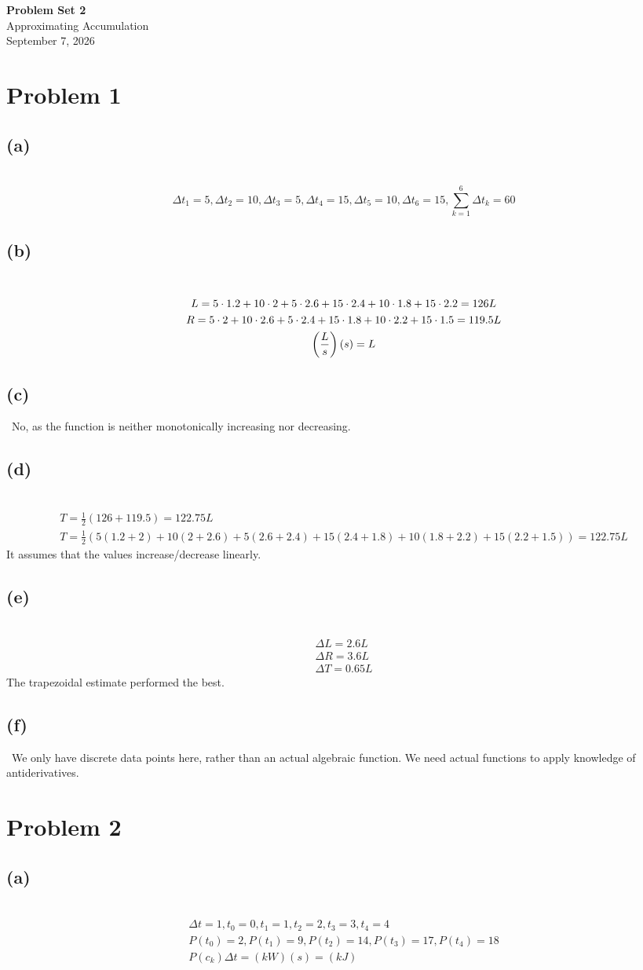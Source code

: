 \documentclass[12pt]{article}
\newcommand*{\paren}[1]{\ensuremath\left(#1\right)}
\newcommand{\vem}{\vspace{0.5em}}
\newcommand{\problem}[1]{\section{Problem #1}}
\newcommand{\subproblem}[1]{\subsection{(#1)} \,}
\begin{document}
\vspace*{0cm}

\begin{center}
    {\Large \bfseries Problem Set 2} \\[0.5cm]
    {\large Approximating Accumulation} \\[0.35cm]
    {\normalsize September 7, 2026}
\end{center}


\problem{1}

\subproblem{a}
\[
\Delta t_1=5, \Delta t_2=10,\Delta t_3=5,\Delta t_4=15, \Delta t_5=10, \Delta t_6=15, \sum_{k=1}^{6}\Delta t_k=60
\]

\subproblem{b}
\begin{gather*}
    L=5\cdot 1.2+10\cdot 2+5\cdot 2.6+15\cdot 2.4+10\cdot 1.8 +15\cdot 2.2=126 L\\
    R=5\cdot 2+10\cdot 2.6+5\cdot 2.4+15\cdot 1.8+10\cdot 2.2 + 15\cdot 1.5= 119.5L\\
    \paren{\frac{L}{s}}(s)=L
\end{gather*}

\subproblem{c}
No, as the function is neither monotonically increasing nor decreasing. \vem

\subproblem{d}
\begin{gather*}
    T=\frac{1}{2}(126+119.5)=122.75L\\
    T=\frac{1}{2}(5(1.2+2)+10(2+2.6)+5 (2.6+2.4)+15(2.4+1.8)+10(1.8+2.2)+15(2.2+1.5))=122.75L
\end{gather*}
It assumes that the values increase/decrease linearly.\vem

\subproblem{e}
\begin{gather*}
    \Delta L=2.6L\\
    \Delta R=3.6L\\
    \Delta T=0.65L
\end{gather*}
The trapezoidal estimate performed the best.\vem

\subproblem{f}
We only have discrete data points here, rather than an actual algebraic function. We need actual functions to apply knowledge of antiderivatives. 

\problem{2}

\subproblem{a}
\begin{gather*}
    \Delta t=1, t_0=0,t_1=1,t_2=2,t_3=3,t_4=4\\
    P(t_0)=2,P(t_1)=9,P(t_2)=14,P(t_3)=17,P(t_4)=18\\
    P(c_k)\Delta t= (kW)(s)=(kJ)
\end{gather*}
\end{document}
